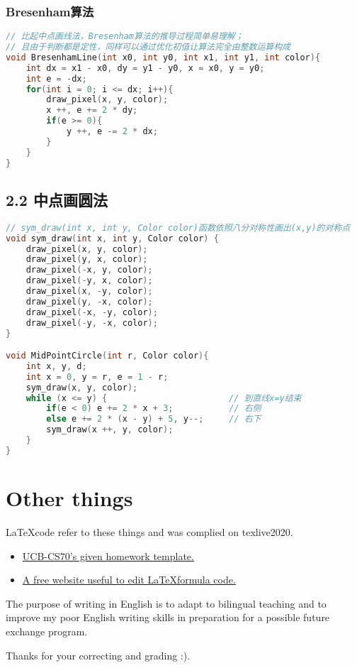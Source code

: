 \documentclass[11pt]{article}  %
\begin{document}
\subsubsection*{Bresenham算法}

\begin{lstlisting}[language = C]
// 比起中点画线法，Bresenham算法的推导过程简单易理解；
// 且由于判断都是定性，同样可以通过优化初值让算法完全由整数运算构成
void BresenhamLine(int x0, int y0, int x1, int y1, int color){
    int dx = x1 - x0, dy = y1 - y0, x = x0, y = y0;
    int e = -dx;
    for(int i = 0; i <= dx; i++){
        draw_pixel(x, y, color);
        x ++, e += 2 * dy;
        if(e >= 0){
            y ++, e -= 2 * dx;
        }
    }
}
\end{lstlisting}

\subsection*{2.2 中点画圆法}

\begin{lstlisting}[language = C]
// sym_draw(int x, int y, Color color)函数依照八分对称性画出(x,y)的对称点
void sym_draw(int x, int y, Color color) {
	draw_pixel(x, y, color);
	draw_pixel(y, x, color);
	draw_pixel(-x, y, color);
	draw_pixel(-y, x, color);
	draw_pixel(x, -y, color);
	draw_pixel(y, -x, color);
	draw_pixel(-x, -y, color);
	draw_pixel(-y, -x, color);
}

void MidPointCircle(int r, Color color){
    int x, y, d;
    int x = 0, y = r, e = 1 - r;            
    sym_draw(x, y, color);             
    while (x <= y) {                        // 到直线x=y结束
        if(e < 0) e += 2 * x + 3;           // 右侧
        else e += 2 * (x - y) + 5, y--;     // 右下
        sym_draw(x ++, y, color);
    }
}
\end{lstlisting}

\section*{Other things}

\LaTeX \space code refer to these things and was complied on texlive2020.
\begin{itemize}
    \item  \href{https://www.eecs70.org/assets/misc/homework_template.tex}{UCB-CS70's given homework template.} 
    \item  \href{https://www.latexlive.com}{A free website useful to edit \LaTeX \space formula code.}
\end{itemize}

The purpose of writing in English is to adapt to bilingual teaching and to improve my poor English 
writing skills in preparation for a possible future exchange program. 

Thanks for your correcting and grading :).
\end{document}
